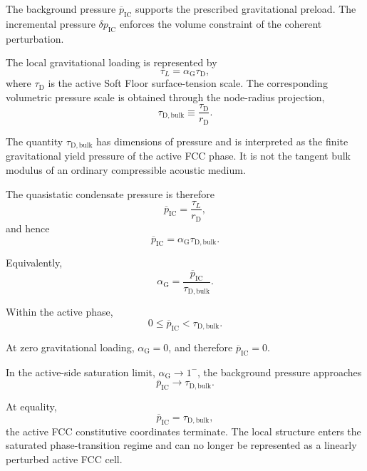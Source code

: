 The background pressure $\overline{p}_{\mathrm{IC}}$ supports the prescribed gravitational preload. The incremental pressure $\delta p_{\mathrm{IC}}$ enforces the volume constraint of the coherent perturbation.

The local gravitational loading is represented by
\begin{equation}
    \tau_L = \alpha_{\mathrm{G}}\tau_{\mathrm{D}},
\end{equation}
where $\tau_{\mathrm{D}}$ is the active Soft Floor surface-tension scale. The corresponding volumetric pressure scale is obtained through the node-radius projection,
\begin{equation}
    \tau_{\mathrm{D,bulk}} \equiv \frac{\tau_{\mathrm{D}}}{r_{\mathrm{D}}}.
\end{equation}

The quantity $\tau_{\mathrm{D,bulk}}$ has dimensions of pressure and is interpreted as the finite gravitational yield pressure of the active FCC phase. It is not the tangent bulk modulus of an ordinary compressible acoustic medium.

The quasistatic condensate pressure is therefore
\begin{equation}
    \overline{p}_{\mathrm{IC}} = \frac{\tau_L}{r_{\mathrm{D}}},
\end{equation}
and hence
\begin{equation}
    \overline{p}_{\mathrm{IC}} = \alpha_{\mathrm{G}}\tau_{\mathrm{D,bulk}}.
\end{equation}

Equivalently,
\begin{equation}
    \alpha_{\mathrm{G}} = \frac{\overline{p}_{\mathrm{IC}}}{\tau_{\mathrm{D,bulk}}}.
\end{equation}

Within the active phase,
\begin{equation}
    0 \leq \overline{p}_{\mathrm{IC}} < \tau_{\mathrm{D,bulk}}.
\end{equation}

At zero gravitational loading, $\alpha_{\mathrm{G}}=0$, and therefore $\overline{p}_{\mathrm{IC}}=0$.

In the active-side saturation limit, $\alpha_{\mathrm{G}}\rightarrow1^{-}$, the background pressure approaches
\begin{equation}
    \overline{p}_{\mathrm{IC}} \rightarrow \tau_{\mathrm{D,bulk}}.
\end{equation}

At equality,
\begin{equation}
    \overline{p}_{\mathrm{IC}} = \tau_{\mathrm{D,bulk}},
\end{equation}
the active FCC constitutive coordinates terminate. The local structure enters the saturated phase-transition regime and can no longer be represented as a linearly perturbed active FCC cell.

